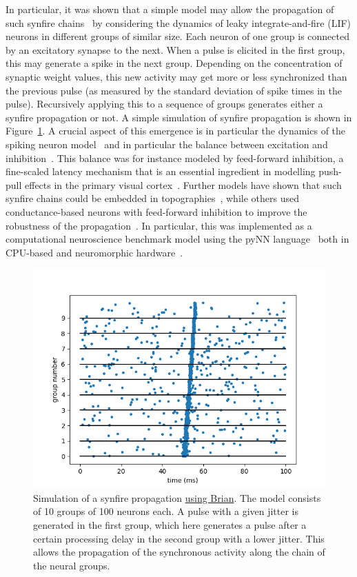 \documentclass[brainsci, %
               review,submit,pdftex,moreauthors
               ]{Definitions/mdpi}
\begin{document}
In particular, it was shown that a simple model may allow the propagation of such synfire chains~\citep{gewaltig_propagation_2001} by considering the dynamics of leaky integrate-and-fire (LIF) neurons in different groups of similar size. Each neuron of one group is connected by an excitatory synapse to the next. When a pulse is elicited in the first group, this may generate a spike in the next group. Depending on the concentration of synaptic weight values, this new activity may get more or less synchronized than the previous pulse (as measured by the standard deviation of spike times in the pulse). Recursively applying this to a sequence of groups generates either a synfire propagation or not. A simple simulation of synfire propagation is shown in Figure~\ref{fig:diesman}. A crucial aspect of this emergence is in particular the dynamics of the spiking neuron model~\citep{gerstner_time_1995} and in particular the balance between excitation and inhibition~\citep{azouz_stimulus-selective_2008}. This balance was for instance modeled by feed-forward inhibition, a fine-scaled latency mechanism that is an essential ingredient in modelling push-pull effects in the primary visual cortex~\citep{kremkow_push-pull_2016}. Further models have shown that such synfire chains could be embedded in topographies~\citep{aviel_embedding_2003}, while others used conductance-based neurons with feed-forward inhibition to improve the robustness of the propagation~\citep{kremkow_functional_2010}. In particular, this was implemented as a computational neuroscience benchmark model using the pyNN language~\citep{davison_pynn_2008} both in CPU-based and neuromorphic hardware~\citep{pfeil_six_2013}. %
%
\begin{figure}
\centering
\includegraphics[width=.4\textwidth]{figures/Diesmann_et_al_1999.png}
\caption{Simulation of a synfire propagation \href{https://brian2.readthedocs.io/en/stable/examples/frompapers.Diesmann_et_al_1999.html}{using Brian}. The model consists of 10 groups of 100 neurons each. A pulse with a given jitter is generated in the first group, which here generates a pulse after a certain processing delay in the second group with a lower jitter. This allows the propagation of the synchronous activity along the chain of the neural groups.}\label{fig:diesman}
\end{figure}
\end{document}

